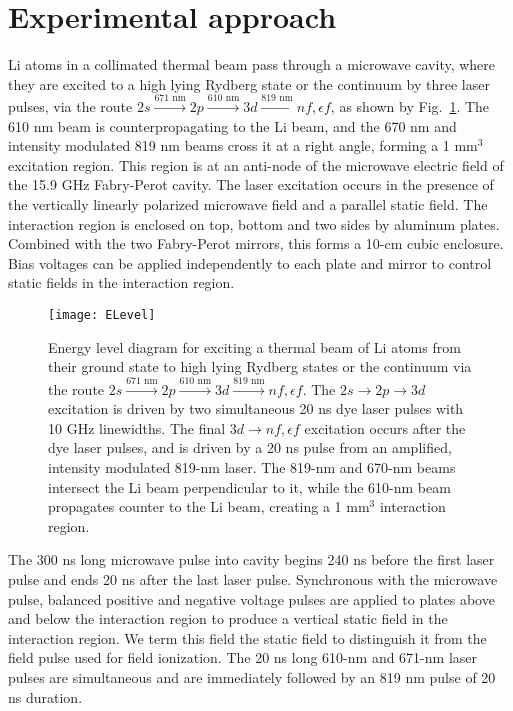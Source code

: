 \documentclass[aps,pra,reprint,groupedaddress]{revtex4-1}
\begin{document}
\section{\label{sec:exp} Experimental approach}

Li atoms in a collimated thermal beam pass through a microwave cavity, where they are excited to a high lying Rydberg state or the continuum by three laser pulses, via the route $2s \xrightarrow{\text{671 nm}} 2p \xrightarrow{\text{610 nm}} 3d \xrightarrow{\text{819 nm}} nf, \epsilon f$, as shown by Fig.~\ref{fig:ELev}. The 610 nm beam is counterpropagating to the Li beam, and the 670 nm and intensity modulated 819 nm beams cross it at a right angle, forming a 1 mm$^3$ excitation region. This region is at an anti-node of the microwave electric field of the 15.9 GHz Fabry-Perot cavity. The laser excitation occurs in the presence of the vertically linearly polarized microwave field and a parallel static field. The interaction region is enclosed on top, bottom and two sides by aluminum plates. Combined with the two Fabry-Perot mirrors, this forms a 10-cm cubic enclosure. Bias voltages can be applied independently to each plate and mirror to control static fields in the interaction region.

\begin{figure}
	\texttt{[image: ELevel]}
	\caption{Energy level diagram for exciting a thermal beam of Li atoms from their ground state to high lying Rydberg states or the continuum via the route $2s \xrightarrow{\text{671 nm}} 2p \xrightarrow{\text{610 nm}} 3d \xrightarrow{\text{819 nm}} nf, \epsilon f$. The $2s \rightarrow 2p \rightarrow 3d$ excitation is driven by two simultaneous 20 ns dye laser pulses with 10 GHz linewidths. The final $3d \rightarrow nf, \epsilon f$ excitation occurs after the dye laser pulses, and is driven by a 20 ns pulse from an amplified, intensity modulated 819-nm laser. The 819-nm and 670-nm beams intersect the Li beam perpendicular to it, while the 610-nm beam propagates counter to the Li beam, creating a 1 mm$^3$ interaction region.}
	\label{fig:ELev}
\end{figure}

The 300 ns long microwave pulse into cavity begins 240 ns before the first laser pulse and ends 20 ns after the last laser pulse. Synchronous with the microwave pulse, balanced positive and negative voltage pulses are applied to plates above and below the interaction region to produce a vertical static field in the interaction region. We term this field the static field to distinguish it from the field pulse used for field ionization. The 20 ns long 610-nm and 671-nm laser pulses are simultaneous and are immediately followed by an 819 nm pulse of 20 ns duration.
\end{document}
